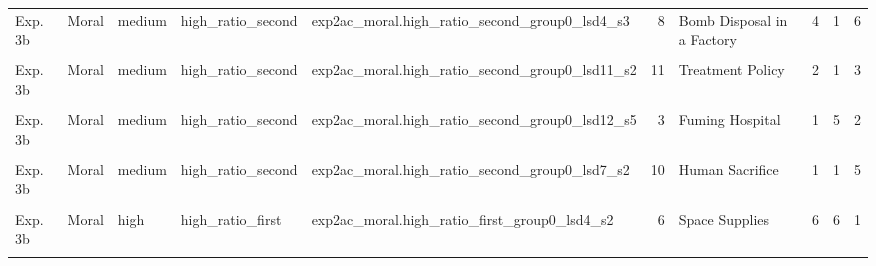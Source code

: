 \documentclass[
]{article}
\begin{document}
\begin{longtable}[t]{lllllrlrrr}
Exp. 3b & Moral & medium & high\_ratio\_second & exp2ac\_moral.high\_ratio\_second\_group0\_lsd4\_s3 & 8 & Bomb Disposal in a Factory & 4 & 1 & 6\\
\addlinespace
\cellcolor{gray!10}{Exp. 3b} & \cellcolor{gray!10}{Moral} & \cellcolor{gray!10}{medium} & \cellcolor{gray!10}{high\_ratio\_second} & \cellcolor{gray!10}{exp2ac\_moral.high\_ratio\_second\_group0\_lsd7\_s1} & \cellcolor{gray!10}{8} & \cellcolor{gray!10}{Bomb Disposal in a Factory} & \cellcolor{gray!10}{4} & \cellcolor{gray!10}{1} & \cellcolor{gray!10}{5}\\
Exp. 3b & Moral & medium & high\_ratio\_second & exp2ac\_moral.high\_ratio\_second\_group0\_lsd11\_s2 & 11 & Treatment Policy & 2 & 1 & 3\\
\cellcolor{gray!10}{Exp. 3b} & \cellcolor{gray!10}{Moral} & \cellcolor{gray!10}{medium} & \cellcolor{gray!10}{high\_ratio\_second} & \cellcolor{gray!10}{exp2ac\_moral.high\_ratio\_second\_group0\_lsd2\_s3} & \cellcolor{gray!10}{11} & \cellcolor{gray!10}{Treatment Policy} & \cellcolor{gray!10}{2} & \cellcolor{gray!10}{1} & \cellcolor{gray!10}{5}\\
Exp. 3b & Moral & medium & high\_ratio\_second & exp2ac\_moral.high\_ratio\_second\_group0\_lsd12\_s5 & 3 & Fuming Hospital & 1 & 5 & 2\\
\cellcolor{gray!10}{Exp. 3b} & \cellcolor{gray!10}{Moral} & \cellcolor{gray!10}{medium} & \cellcolor{gray!10}{high\_ratio\_second} & \cellcolor{gray!10}{exp2ac\_moral.high\_ratio\_second\_group0\_lsd9\_s1} & \cellcolor{gray!10}{5} & \cellcolor{gray!10}{Hopsital Power Outage} & \cellcolor{gray!10}{1} & \cellcolor{gray!10}{4} & \cellcolor{gray!10}{4}\\
\addlinespace
Exp. 3b & Moral & medium & high\_ratio\_second & exp2ac\_moral.high\_ratio\_second\_group0\_lsd7\_s2 & 10 & Human Sacrifice & 1 & 1 & 5\\
\cellcolor{gray!10}{Exp. 3b} & \cellcolor{gray!10}{Moral} & \cellcolor{gray!10}{high} & \cellcolor{gray!10}{high\_ratio\_first} & \cellcolor{gray!10}{exp2ac\_moral.high\_ratio\_first\_group0\_lsd3\_s5} & \cellcolor{gray!10}{6} & \cellcolor{gray!10}{Space Supplies} & \cellcolor{gray!10}{6} & \cellcolor{gray!10}{7} & \cellcolor{gray!10}{1}\\
Exp. 3b & Moral & high & high\_ratio\_first & exp2ac\_moral.high\_ratio\_first\_group0\_lsd4\_s2 & 6 & Space Supplies & 6 & 6 & 1\\
\cellcolor{gray!10}{Exp. 3b} & \cellcolor{gray!10}{Moral} & \cellcolor{gray!10}{high} & \cellcolor{gray!10}{high\_ratio\_first} & \cellcolor{gray!10}{exp2ac\_moral.high\_ratio\_first\_group0\_lsd4\_s4} & \cellcolor{gray!10}{6} & \cellcolor{gray!10}{Space Supplies} & \cellcolor{gray!10}{6} & \cellcolor{gray!10}{7} & \cellcolor{gray!10}{1}\\

\end{longtable}
\end{document}
